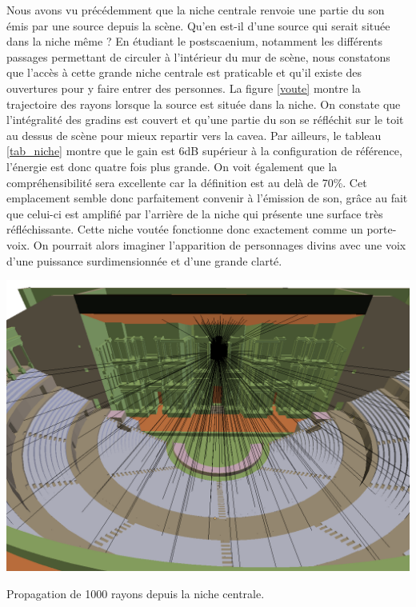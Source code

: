 Nous avons vu précédemment que la niche centrale renvoie une partie du son émis par une source depuis la scène. Qu'en est-il d'une source qui serait située dans la niche même ? En étudiant le \gls{postscaenium}, notamment les différents passages permettant de circuler à l'intérieur du mur de scène, nous constatons que l'accès à cette grande niche centrale est praticable et qu'il existe des ouvertures pour y faire entrer des personnes. La figure \ref{voute} montre la trajectoire des rayons lorsque la source est située dans la niche. On constate que l'intégralité des gradins est couvert et qu'une partie du son se réfléchit sur le toit au dessus de scène pour mieux repartir vers la \gls{cavea}. Par ailleurs, le tableau \ref{tab_niche} montre que le gain est 6dB supérieur à la configuration de référence, l'énergie est donc quatre fois plus grande. On voit également que la compréhensibilité sera excellente car la définition est au delà de 70\%. Cet emplacement semble donc parfaitement convenir à l'émission de son, grâce au fait que celui-ci est amplifié par l'arrière de la niche qui présente une surface très réfléchissante. Cette niche voutée fonctionne donc exactement comme un porte-voix. On pourrait alors imaginer l'apparition de personnages divins \cite[p.12]{vitruve} avec une voix d'une puissance surdimensionnée et d'une grande clarté.
\begin{figureth}
	\includegraphics[width=0.8\linewidth]{images/voute}
	\caption{Propagation de 1000 rayons depuis la niche centrale.}
	\label{voute}
\end{figureth}

